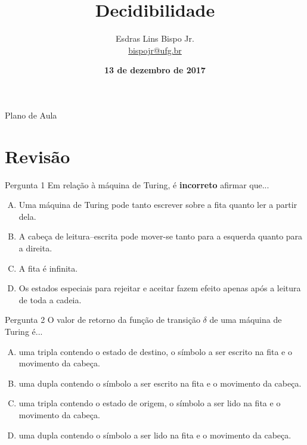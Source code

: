 \documentclass[xcolor=dvipsnames,table]{beamer}
\title{Decidibilidade}
\author{
  Esdras Lins Bispo Jr. \\ \url{bispojr@ufg.br}
  }
\institute{
  Teoria da Computação \\Bacharelado em Ciência da Computação}
\date{\textbf{13 de dezembro de 2017} }
\begin{document}
	\begin{frame}
		\titlepage
	\end{frame}

	\AtBeginSection{
		\begin{frame}{Sumário}%
    		\tableofcontents[currentsection]
		\end{frame}
	}

	\begin{frame}{Plano de Aula}
		\tableofcontents
	\end{frame}
	
	
	\section{Revisão}
	\begin{frame}
		\begin{block}{Pergunta 1}
			Em relação à máquina de Turing, é {\bf incorreto} afirmar que...
		\end{block}
		\begin{enumerate}[(A)]
			\item Uma máquina de Turing pode tanto escrever sobre a fita quanto ler a partir dela.
			\item A cabeça de leitura–escrita pode mover-se tanto para a esquerda quanto para a direita.
			\item A fita é infinita.
			\item Os estados especiais para rejeitar e aceitar fazem efeito apenas após a leitura de toda a cadeia.
		\end{enumerate}
	\end{frame}

	\begin{frame}
		\begin{block}{Pergunta 2}
			O valor de retorno da função de transição $\delta$ de uma máquina de Turing é...
		\end{block}
		\begin{enumerate}[(A)]
			\item uma tripla contendo o estado de destino, o símbolo a ser escrito na fita e o movimento da cabeça.
			\item uma dupla contendo o símbolo a ser escrito na fita e o movimento da cabeça.
			\item uma tripla contendo o estado de origem, o símbolo a ser lido na fita e o movimento da cabeça.
			\item uma dupla contendo o símbolo a ser lido na fita e o movimento da cabeça.
		\end{enumerate}
	\end{frame}
\end{document}
